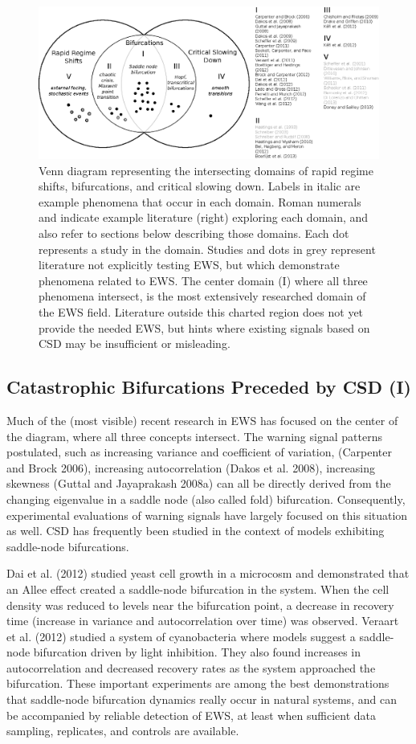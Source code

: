 \documentclass{article}
\begin{document}
\begin{figure}[htbp]
\centering
\includegraphics{ews-venn.eps}
\caption{Venn diagram representing the intersecting domains of rapid
regime shifts, bifurcations, and critical slowing down. Labels in italic
are example phenomena that occur in each domain. Roman numerals and
indicate example literature (right) exploring each domain, and also
refer to sections below describing those domains. Each dot represents a
study in the domain. Studies and dots in grey represent literature not
explicitly testing EWS, but which demonstrate phenomena related to EWS.
The center domain (I) where all three phenomena intersect, is the most
extensively researched domain of the EWS field. Literature outside this
charted region does not yet provide the needed EWS, but hints where
existing signals based on CSD may be insufficient or misleading.}
\end{figure}

\subsection{Catastrophic Bifurcations Preceded by CSD (I)}

Much of the (most visible) recent research in EWS has focused on the
center of the diagram, where all three concepts intersect. The warning
signal patterns postulated, such as increasing variance and coefficient
of variation, (Carpenter and Brock 2006), increasing autocorrelation
(Dakos et al. 2008), increasing skewness (Guttal and Jayaprakash 2008a)
can all be directly derived from the changing eigenvalue in a saddle
node (also called fold) bifurcation. Consequently, experimental
evaluations of warning signals have largely focused on this situation as
well. CSD has frequently been studied in the context of models
exhibiting saddle-node bifurcations.

Dai et al. (2012) studied yeast cell growth in a microcosm and
demonstrated that an Allee effect created a saddle-node bifurcation in
the system. When the cell density was reduced to levels near the
bifurcation point, a decrease in recovery time (increase in variance and
autocorrelation over time) was observed. Veraart et al. (2012) studied a
system of cyanobacteria where models suggest a saddle-node bifurcation
driven by light inhibition. They also found increases in autocorrelation
and decreased recovery rates as the system approached the bifurcation.
These important experiments are among the best demonstrations that
saddle-node bifurcation dynamics really occur in natural systems, and
can be accompanied by reliable detection of EWS, at least when
sufficient data sampling, replicates, and controls are available.
\end{document}
